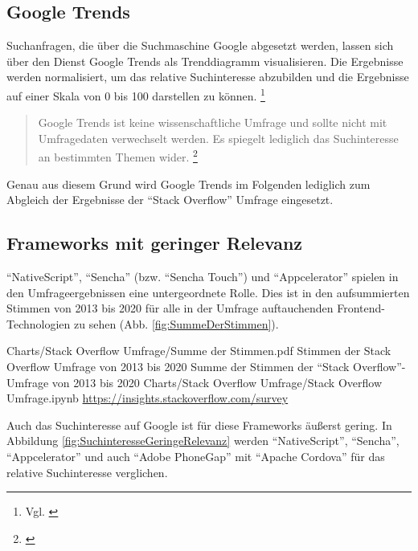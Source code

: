 \subsection{Google Trends} Suchanfragen, die über die Suchmaschine Google abgesetzt werden, lassen sich  über den Dienst Google Trends  als Trenddiagramm visualisieren.
Die Ergebnisse werden normalisiert, um das relative Suchinteresse abzubilden und die Ergebnisse auf einer Skala von 0 bis 100 darstellen zu können.
\footnote{Vgl. \cite{GoogleTrendsHilfe}}

\begin{quotation}
Google Trends ist keine wissenschaftliche Umfrage und sollte nicht mit Umfragedaten verwechselt werden.
Es spiegelt lediglich das Suchinteresse an bestimmten Themen wider.
\footnote{\cite{GoogleTrendsHilfe}}
\end{quotation}

Genau aus diesem Grund wird Google Trends im Folgenden lediglich zum Abgleich der Ergebnisse der \enquote{Stack Overflow} Umfrage eingesetzt.

\clearpage
\subsection{Frameworks mit geringer Relevanz}

\enquote{NativeScript}, \enquote{Sencha} (bzw.
\enquote{Sencha Touch}) und \enquote{Appcelerator} spielen in den Umfrageergebnissen eine untergeordnete Rolle.
Dies ist in den aufsummierten Stimmen von 2013 bis 2020 für alle in der Umfrage auftauchenden Frontend-Technologien zu sehen (Abb.
\ref{fig:SummeDerStimmen}).

\begin{alexfigurewithnotebook}{Charts/Stack Overflow Umfrage/Summe der Stimmen.pdf}
	{Stimmen der Stack Overflow Umfrage von 2013 bis 2020}
	{Summe der Stimmen der \enquote{Stack Overflow}-Umfrage von 2013 bis 2020}
	{Charts/Stack Overflow Umfrage/Stack Overflow Umfrage.ipynb}
	{\url{https://insights.stackoverflow.com/survey}}

	\label{fig:SummeDerStimmen}

\end{alexfigurewithnotebook}

Auch das Suchinteresse auf Google ist für diese Frameworks äußerst gering.
In Abbildung \ref{fig:SuchinteresseGeringeRelevanz} werden \enquote{NativeScript}, \enquote{Sencha}, \enquote{Appcelerator} und auch \enquote{Adobe PhoneGap} mit \enquote{Apache Cordova} für das relative Suchinteresse verglichen.

